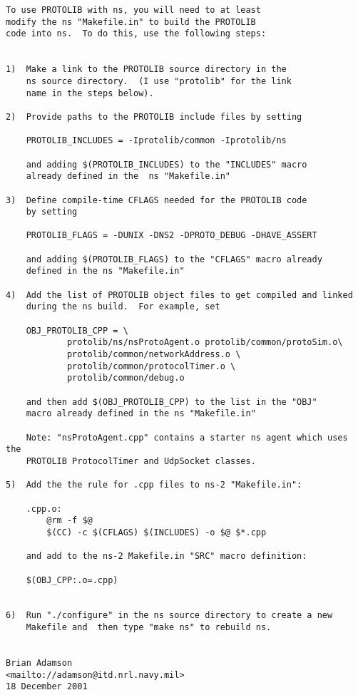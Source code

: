 \footnotesize
\begin{verbatim}
To use PROTOLIB with ns, you will need to at least
modify the ns "Makefile.in" to build the PROTOLIB
code into ns.  To do this, use the following steps:


1)  Make a link to the PROTOLIB source directory in the
    ns source directory.  (I use "protolib" for the link 
    name in the steps below). 

2)  Provide paths to the PROTOLIB include files by setting

    PROTOLIB_INCLUDES = -Iprotolib/common -Iprotolib/ns

    and adding $(PROTOLIB_INCLUDES) to the "INCLUDES" macro
    already defined in the  ns "Makefile.in" 

3)  Define compile-time CFLAGS needed for the PROTOLIB code
    by setting

    PROTOLIB_FLAGS = -DUNIX -DNS2 -DPROTO_DEBUG -DHAVE_ASSERT

    and adding $(PROTOLIB_FLAGS) to the "CFLAGS" macro already
    defined in the ns "Makefile.in"

4)  Add the list of PROTOLIB object files to get compiled and linked
    during the ns build.  For example, set

    OBJ_PROTOLIB_CPP = \
            protolib/ns/nsProtoAgent.o protolib/common/protoSim.o\
            protolib/common/networkAddress.o \ 
            protolib/common/protocolTimer.o \
            protolib/common/debug.o

    and then add $(OBJ_PROTOLIB_CPP) to the list in the "OBJ" 
    macro already defined in the ns "Makefile.in"

    Note: "nsProtoAgent.cpp" contains a starter ns agent which uses the
    PROTOLIB ProtocolTimer and UdpSocket classes.

5)  Add the the rule for .cpp files to ns-2 "Makefile.in":

    .cpp.o:
	    @rm -f $@
	    $(CC) -c $(CFLAGS) $(INCLUDES) -o $@ $*.cpp
        
    and add to the ns-2 Makefile.in "SRC" macro definition:
    
    $(OBJ_CPP:.o=.cpp)
    

6)  Run "./configure" in the ns source directory to create a new
    Makefile and  then type "make ns" to rebuild ns.
    
    
Brian Adamson
<mailto://adamson@itd.nrl.navy.mil>
18 December 2001
\end{verbatim}
\normalsize

